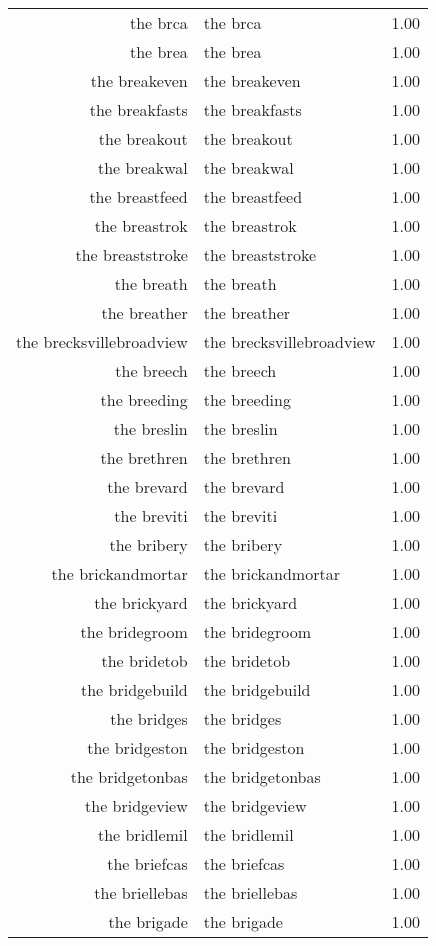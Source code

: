 \begin{table}[ht]
\begin{tabular}{rlr}
  the brca & the brca & 1.00 \\ 
  the brea & the brea & 1.00 \\ 
  the breakeven & the breakeven & 1.00 \\ 
  the breakfasts & the breakfasts & 1.00 \\ 
  the breakout & the breakout & 1.00 \\ 
  the breakwal & the breakwal & 1.00 \\ 
  the breastfeed & the breastfeed & 1.00 \\ 
  the breastrok & the breastrok & 1.00 \\ 
  the breaststroke & the breaststroke & 1.00 \\ 
  the breath & the breath & 1.00 \\ 
  the breather & the breather & 1.00 \\ 
  the brecksvillebroadview & the brecksvillebroadview & 1.00 \\ 
  the breech & the breech & 1.00 \\ 
  the breeding & the breeding & 1.00 \\ 
  the breslin & the breslin & 1.00 \\ 
  the brethren & the brethren & 1.00 \\ 
  the brevard & the brevard & 1.00 \\ 
  the breviti & the breviti & 1.00 \\ 
  the bribery & the bribery & 1.00 \\ 
  the brickandmortar & the brickandmortar & 1.00 \\ 
  the brickyard & the brickyard & 1.00 \\ 
  the bridegroom & the bridegroom & 1.00 \\ 
  the bridetob & the bridetob & 1.00 \\ 
  the bridgebuild & the bridgebuild & 1.00 \\ 
  the bridges & the bridges & 1.00 \\ 
  the bridgeston & the bridgeston & 1.00 \\ 
  the bridgetonbas & the bridgetonbas & 1.00 \\ 
  the bridgeview & the bridgeview & 1.00 \\ 
  the bridlemil & the bridlemil & 1.00 \\ 
  the briefcas & the briefcas & 1.00 \\ 
  the briellebas & the briellebas & 1.00 \\ 
  the brigade & the brigade & 1.00 \\ 

\end{tabular}
\end{table}
